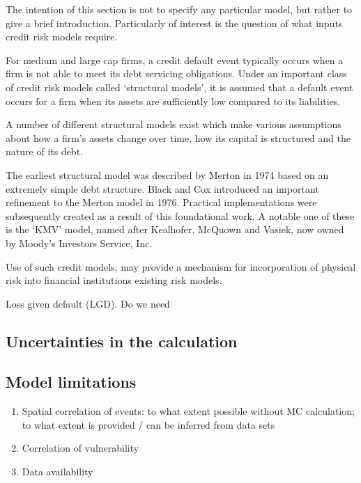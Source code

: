 \documentclass[a4paper,11pt]{extarticle} %
\begin{document}
The intention of this section is not to specify any particular model, but rather to give a brief introduction. Particularly of interest is the question of what inputs credit risk models require.

For medium and large cap firms, a credit default event typically occurs when a firm is not able to meet its debt servicing obligations. Under an important class of credit risk models called `structural models', it is assumed that a default event occurs for a firm when its assets are sufficiently low compared to its liabilities.

A number of different structural models exist which make various assumptions about how a firm's assets change over time, how its capital is structured and the nature of its debt.

The earliest structural model was described by Merton in 1974 \cite{Merton:1974} based on an extremely simple debt structure. Black and Cox \cite{BlackCox:1976} introduced an important refinement to the Merton model in 1976. Practical implementations were subsequently created as a result of this foundational work. A notable one of these is the `KMV' model, named after Kealhofer, McQuown and Vasiek, now owned by Moody's Investors Service, Inc.

Use of such credit models, may provide a mechanism for incorporation of physical risk into financial institutions existing risk models\cite{KenyonEtAl:2021}.


Loss given default (LGD). Do we need 


\subsection{Uncertainties in the calculation}

\subsection{Model limitations}

\begin{enumerate}
    \item Spatial correlation of events: to what extent possible without MC calculation; to what extent is provided / can be inferred from data sets
    \item Correlation of vulnerability
    \item Data availability
\end{enumerate}
\end{document}

